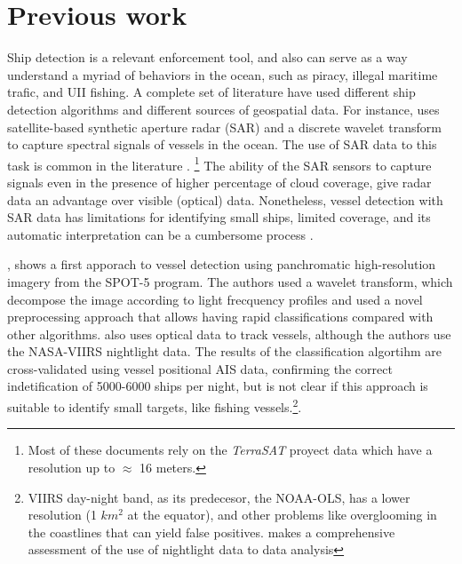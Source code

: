 \section{Previous work}

Ship detection is a relevant enforcement tool, and also can serve as a way understand a myriad of behaviors in the ocean, such as piracy, illegal 
maritime trafic, and UII fishing. A complete set of literature have used different ship detection algorithms and different sources of geospatial
data. For instance,  uses satellite-based synthetic aperture radar (SAR) and a discrete wavelet transform to capture spectral 
signals of vessels in the ocean. The use of SAR data to this task is common in the literature \cite{Margarit2009, Brusch2011, Corbane2008, Paes2010}.
\footnote{Most of these documents rely on the \textit{TerraSAT} proyect data which have a resolution up to $\approx$ 16 meters.} The ability of the SAR 
sensors to capture signals even in the presence of higher percentage of cloud coverage, give radar data an advantage over visible (optical) data. 
Nonetheless, vessel detection with SAR data has limitations for identifying small ships, limited coverage, and its automatic interpretation can be a 
cumbersome process \cite{Zhang2006}.  

, shows a first apporach to vessel detection using panchromatic high-resolution imagery from the SPOT-5 program. The authors used 
a wavelet transform, which decompose the image according to light frecquency profiles and used a novel preprocessing approach that allows having rapid 
classifications compared with other algorithms.  also uses optical data to track vessels, although the authors use the NASA-VIIRS 
nightlight data. The results of the classification algortihm are cross-validated using vessel positional AIS data, confirming the correct indetification 
of 5000-6000 ships per night, but is not clear if this approach is suitable to identify small targets, like fishing vessels.\footnote{VIIRS day-night 
band, as its predecesor, the NOAA-OLS, has a lower resolution (1 $km^{2}$ at the equator), and other problems like overglooming in the coastlines that 
can yield false positives.  makes a comprehensive assessment of the use of nightlight data to data analysis}.


